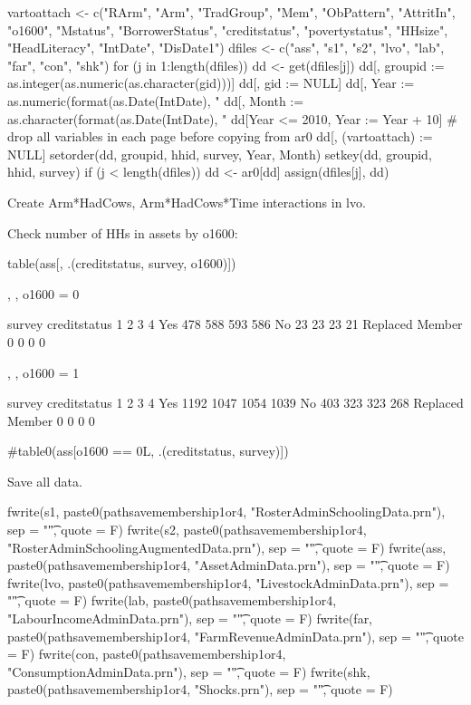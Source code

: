 \begin{Schunk}
\begin{Sinput}
vartoattach <- c("RArm", "Arm", "TradGroup", "Mem", "ObPattern", "AttritIn", 
  "o1600", "Mstatus", "BorrowerStatus", "creditstatus", "povertystatus", 
  "HHsize", "HeadLiteracy", "IntDate", "DisDate1")
dfiles <- c("ass", "s1", "s2", "lvo", "lab", "far", "con", "shk")
for (j in 1:length(dfiles)) {
  dd <- get(dfiles[j])
  dd[, groupid := as.integer(as.numeric(as.character(gid)))]
  dd[, gid := NULL]
  dd[, Year :=  as.numeric(format(as.Date(IntDate), "%Y"))]
  dd[, Month := as.character(format(as.Date(IntDate), "%B"))]
  dd[Year <= 2010, Year := Year + 10]
  # drop all variables in each page before copying from ar0
  dd[, (vartoattach) := NULL]
  setorder(dd, groupid, hhid, survey, Year, Month)
  setkey(dd, groupid, hhid, survey)
  if (j < length(dfiles)) dd <- ar0[dd]
  assign(dfiles[j], dd)
}
\end{Sinput}
\end{Schunk}
Create \textsf{Arm*HadCows}, \textsf{Arm*HadCows*Time} interactions in \textsf{lvo}. \gobblepars

Check number of HHs in assets by \textsf{o1600}:
\begin{Schunk}
\begin{Sinput}
table(ass[, .(creditstatus, survey, o1600)])
\end{Sinput}
\begin{Soutput}
, , o1600 = 0

                 survey
creditstatus         1    2    3    4
  Yes              478  588  593  586
  No                23   23   23   21
  Replaced Member    0    0    0    0

, , o1600 = 1

                 survey
creditstatus         1    2    3    4
  Yes             1192 1047 1054 1039
  No               403  323  323  268
  Replaced Member    0    0    0    0
\end{Soutput}
\begin{Sinput}
#table0(ass[o1600 == 0L, .(creditstatus, survey)])
\end{Sinput}
\end{Schunk}
Save all data.

\begin{Schunk}
\begin{Sinput}
fwrite(s1, paste0(pathsavemembership1or4, "RosterAdminSchoolingData.prn"), sep = "\t", quote = F)
fwrite(s2, paste0(pathsavemembership1or4, "RosterAdminSchoolingAugmentedData.prn"), sep = "\t", quote = F)
fwrite(ass, paste0(pathsavemembership1or4, "AssetAdminData.prn"), sep = "\t", quote = F)
fwrite(lvo, paste0(pathsavemembership1or4, "LivestockAdminData.prn"), sep = "\t", quote = F)
fwrite(lab, paste0(pathsavemembership1or4, "LabourIncomeAdminData.prn"), sep = "\t", quote = F)
fwrite(far, paste0(pathsavemembership1or4, "FarmRevenueAdminData.prn"), sep = "\t", quote = F)
fwrite(con, paste0(pathsavemembership1or4, "ConsumptionAdminData.prn"), sep = "\t", quote = F)
fwrite(shk, paste0(pathsavemembership1or4, "Shocks.prn"), sep = "\t", quote = F)
\end{Sinput}
\end{Schunk}





